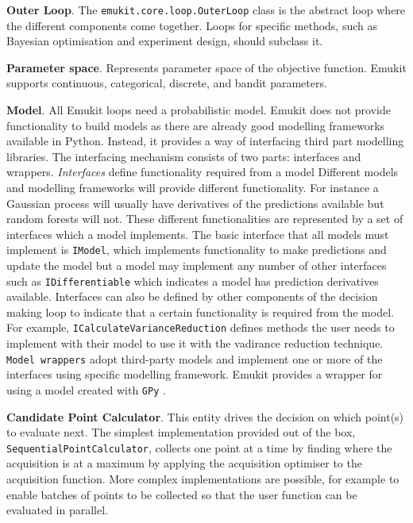 \textbf{Outer Loop}. The \texttt{emukit.core.loop.OuterLoop} class is the abstract loop where the different components come together. Loops for specific methods, such as Bayesian optimisation and experiment design, should subclass it.

\textbf{Parameter space}. Represents parameter space of the objective function. Emukit supports continuous, categorical, discrete, and bandit parameters.

\textbf{Model}. All Emukit loops need a probabilistic model. Emukit does not provide functionality to build models as there are already good modelling frameworks available in Python. Instead, it provides a way of interfacing third part modelling libraries. The interfacing mechanism consists of two parts: interfaces and wrappers. \textit{Interfaces} define functionality required from a model Different models and modelling frameworks will provide different functionality. For instance a Gaussian process will usually have derivatives of the predictions available but random forests will not. These different functionalities are represented by a set of interfaces which a model implements. The basic interface that all models must implement is \texttt{IModel}, which implements functionality to make predictions and update the model but a model may implement any number of other interfaces such as \texttt{IDifferentiable} which indicates a model has prediction derivatives available. Interfaces can also be defined by other components of the decision making loop to indicate that a certain functionality is required from the model. For example, \texttt{ICalculateVarianceReduction} defines methods the user needs to implement with their model to use it with the vadirance reduction technique. \texttt{Model wrappers} adopt third-party models and implement one or more of the interfaces using specific modelling framework. Emukit provides a wrapper for using a model created with \texttt{GPy} \cite{gpy2014}.

\textbf{Candidate Point Calculator}. This entity drives the decision on which point(s) to evaluate next. The simplest implementation provided out of the box, \texttt{SequentialPointCalculator}, collects one point at a time by finding where the acquisition is at a maximum by applying the acquisition optimiser to the acquisition function. More complex implementations are possible, for example to enable batches of points to be collected so that the user function can be evaluated in parallel.

